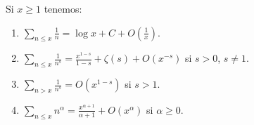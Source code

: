 \documentclass[12pt,a4paper]{book}
\begin{document}
    \begin{teorema}
        Si $x\geq1$ tenemos:
        \begin{enumerate}
            \item[(a)] $\displaystyle\sum_{n\leq x}\frac{1}{n}=\log x+C+O\left(\frac{1}{x}\right)$.
            \item[(b)] $\displaystyle\sum_{n\leq x}\frac{1}{n^{s}}=\frac{x^{1-s}}{1-s}+\zeta(s)+O(x^{-s})$
            si $s>0$, $s\neq1$.
            \item[(c)] $\displaystyle\sum_{n>x}\frac{1}{n^{s}}=O(x^{1-s})$ si $s>1$.
            \item[(d)] $\displaystyle\sum_{n\leq x}n^{\alpha}=\frac{x^{\alpha+1}}{\alpha+1}+O(x^{\alpha})$
            si $\alpha\geq0$.
        \end{enumerate}
    \end{teorema}
\end{document}
